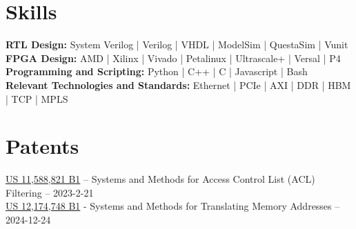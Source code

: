 \documentclass[10pt]{deedy-resume-reversed}
\begin{document}
\begin{minipage}[t]{1.0\textwidth}




\section{Skills}
\textbf{RTL Design:} System Verilog | Verilog | VHDL | ModelSim | QuestaSim | Vunit \\
\textbf{FPGA Design:} AMD | Xilinx | Vivado | Petalinux | Ultrascale+ | Versal | P4 \\
\textbf{Programming and Scripting:} Python | C++ | C | Javascript | Bash \\
\textbf{Relevant Technologies and Standards:} Ethernet | PCIe | AXI | DDR | HBM | TCP | MPLS \\
\sectionsep


\section{Patents}
\href{https://image-ppubs.uspto.gov/dirsearch-public/print/downloadPdf/11588821}{US 11,588,821 B1}
– Systems and Methods for Access Control List (ACL) Filtering – 2023-2-21 \\
\href{https://image-ppubs.uspto.gov/dirsearch-public/print/downloadPdf/12174748}{US 12,174,748 B1}
- Systems and Methods for Translating Memory Addresses – 2024-12-24 \\
\sectionsep

\end{minipage}
\end{document}
